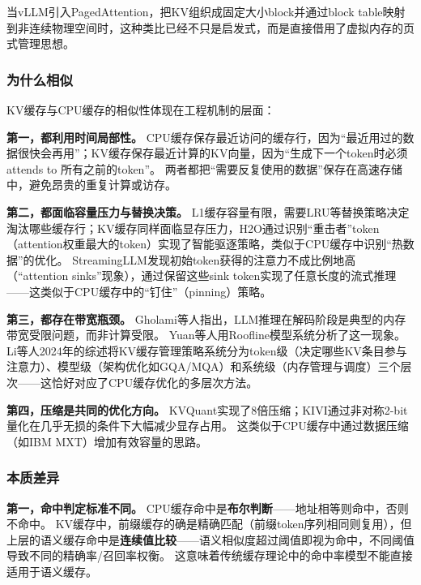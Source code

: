 当vLLM引入PagedAttention，把KV组织成固定大小block并通过block table映射到非连续物理空间时，这种类比已经不只是启发式，而是直接借用了虚拟内存的页式管理思想\cite{kwon2023pagedattention}。

\subsubsection{为什么相似}

KV缓存与CPU缓存的相似性体现在工程机制的层面：

\textbf{第一，都利用时间局部性。}
CPU缓存保存最近访问的缓存行，因为``最近用过的数据很快会再用''；KV缓存保存最近计算的KV向量，因为``生成下一个token时必须 attends to 所有之前的token''。
两者都把``需要反复使用的数据''保存在高速存储中，避免昂贵的重复计算或访存。

\textbf{第二，都面临容量压力与替换决策。}
L1缓存容量有限，需要LRU等替换策略决定淘汰哪些缓存行；KV缓存同样面临显存压力，H2O通过识别``重击者''token（attention权重最大的token）实现了智能驱逐策略\cite{h2o2023}，类似于CPU缓存中识别``热数据''的优化。
StreamingLLM发现初始token获得的注意力不成比例地高（``attention sinks''现象），通过保留这些sink token实现了任意长度的流式推理\cite{xiao2024streamingllm}——这类似于CPU缓存中的``钉住''（pinning）策略。

\textbf{第三，都存在带宽瓶颈。}
Gholami等人指出，LLM推理在解码阶段是典型的内存带宽受限问题，而非计算受限\cite{gholami2024memorywall}。
Yuan等人用Roofline模型系统分析了这一现象\cite{yuan2024llminference}。
Li等人2024年的综述将KV缓存管理策略系统分为token级（决定哪些KV条目参与注意力）、模型级（架构优化如GQA/MQA）和系统级（内存管理与调度）三个层次\cite{likvcache2024survey}——这恰好对应了CPU缓存优化的多层次方法。

\textbf{第四，压缩是共同的优化方向。}
KVQuant实现了8倍压缩\cite{hooper2024kvquant}；KIVI通过非对称2-bit量化在几乎无损的条件下大幅减少显存占用\cite{liu2024kivi}。
这类似于CPU缓存中通过数据压缩（如IBM MXT）增加有效容量的思路。

\subsubsection{本质差异}

\textbf{第一，命中判定标准不同。}
CPU缓存命中是\textbf{布尔判断}——地址相等则命中，否则不命中。
KV缓存中，前缀缓存的确是精确匹配（前缀token序列相同则复用），但上层的语义缓存命中是\textbf{连续值比较}——语义相似度超过阈值即视为命中，不同阈值导致不同的精确率/召回率权衡。
这意味着传统缓存理论中的命中率模型不能直接适用于语义缓存。

